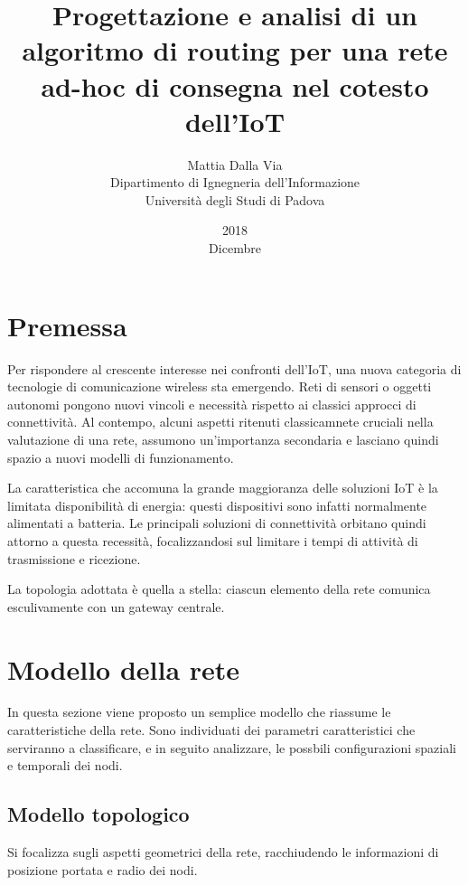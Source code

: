 \documentclass[a4paper,12pt]{article}
\title{Progettazione e analisi di un algoritmo di routing per una rete ad-hoc di consegna nel cotesto dell'IoT}
\date{2018\\ Dicembre}
\author{Mattia Dalla Via\\ Dipartimento di Ignegneria dell'Informazione\\ Università degli Studi di Padova}
\theoremstyle{definition}
\begin{document}
\maketitle

\tableofcontents

\section{Premessa}


Per rispondere al crescente interesse nei confronti dell'IoT, una nuova categoria di tecnologie di comunicazione wireless sta emergendo. Reti di sensori o oggetti autonomi pongono nuovi vincoli e necessità rispetto ai classici approcci di connettività. Al contempo, alcuni aspetti ritenuti classicamnete cruciali nella valutazione di una rete, assumono un'importanza secondaria e lasciano quindi spazio a nuovi modelli di funzionamento.


La caratteristica che accomuna la grande maggioranza delle soluzioni IoT è la limitata disponibilità di energia: questi dispositivi sono infatti normalmente alimentati a batteria. Le principali soluzioni di connettività orbitano quindi attorno a questa recessità, focalizzandosi sul limitare i tempi di attività di trasmissione e ricezione.

La topologia adottata è quella a stella: ciascun elemento della rete comunica esculivamente con un gateway centrale.

\section{Modello della rete}

In questa sezione viene proposto un semplice modello che riassume le caratteristiche della rete. Sono individuati dei parametri caratteristici che serviranno a classificare, e in seguito analizzare, le possbili configurazioni spaziali e temporali dei nodi.

\subsection{Modello topologico}

Si focalizza sugli aspetti geometrici della rete, racchiudendo le informazioni di posizione portata e radio dei nodi.
\end{document}
